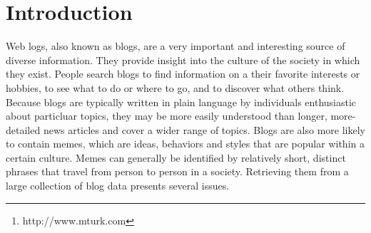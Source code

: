 \documentclass{sig-alternate}
\begin{document}
\maketitle
\begin{abstract}

With the recent development of Web 2.0 technologies and the concamitant explosion of user-generated content has come an incredible wealth of textual data whose form and content demand new strategies for text retrieval and classification.  In this paper we will describe our approach for extracting phrases that potentially allude to ideas, behaviors or styles that spread from person to person within a culture, collectively known as memes, from a large corpus of blog data.  In addition to phrase extraction, we use the canopy clustering approach \cite{McCallum2000} with a modified coefficent to group similar phrases.  Two Amazon Mechanical Turk\footnote{http://www.mturk.com} jobs are used to measure the likelihood that the clusters constitute a meme, and these data are used to build feature sets for supervising two support vector machines to classify the remaining clusters.

\end{abstract}




\section{Introduction}

Web logs, also known as blogs, are a very important and interesting source of diverse information. They provide insight into the culture of the society in which they exist. People search blogs to find information on a their favorite interests or hobbies, to see what to do or where to go, and to discover what others think. Because blogs are typically written in plain language by individuals enthusiastic about particluar topics, they may be more easily understood than longer, more-detailed news articles and cover a wider range of topics. Blogs are also more likely to contain memes, which are ideas, behaviors and styles that are popular within a certain culture. Memes can generally be identified by relatively short, distinct phrases that travel from person to person in a society.  Retrieving them from a large collection of blog data presents several issues. 
\end{document}

